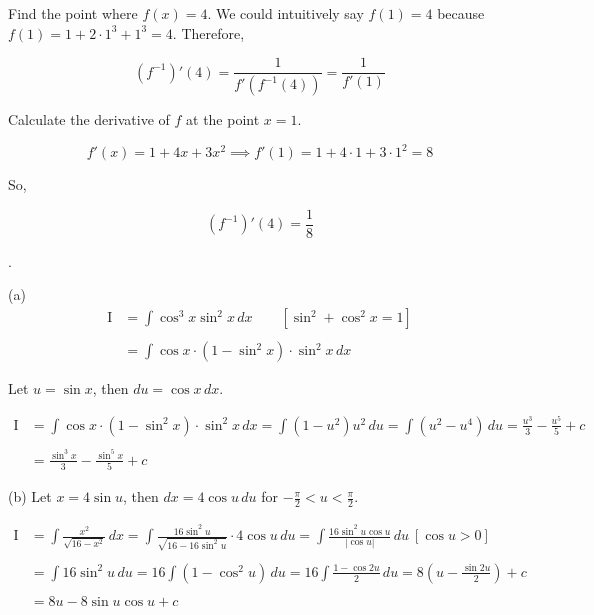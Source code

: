 \documentclass{article}
\begin{document}
\hfill

\noindent Find the point where $f(x)=4$. We could intuitively say $f(1)=4$ because $f(1)=1+2\cdot1^3+1^3=4$. Therefore,

\[(f^{-1})'\left(4\right)=\frac1{f'\left(f^{-1}(4)\right)}=\frac1{f'(1)}\]

\hfill

\noindent Calculate the derivative of $f$ at the point $x=1$.

\[f'(x)=1+4x+3x^2\implies f'(1)=1+4\cdot1+3\cdot1^2=8\]

\hfill

\noindent So,

\[(f^{-1})'\left(4\right)=\boxed{\frac18}\]

\newpage

.

\hfill

\noindent (a)
\begin{align*}
\mathrm{I}&=\int\cos^3x\sin^2x\,dx\qquad\left[\sin^2+\cos^2x=1\right]\\\\&=\int\cos x\cdot\left(1-\sin^2x\right)\cdot\sin^2x\,dx
\end{align*}

\noindent Let $u=\sin x$, then $du=\cos x\,dx$.

\hfill

\begin{align*}
\mathrm{I}&=\int\cos x\cdot\left(1-\sin^2x\right)\cdot\sin^2x\,dx=\int\left(1-u^2\right) u^2\,du=\int\left(u^2-u^4\right)\,du=\frac{u^3}3-\frac{u^5}5+c\\\\&=\boxed{\frac{\sin^3x}3-\frac{\sin^5x}5+c}
\end{align*}

\hfill

\noindent (b) Let $x=4\sin u$, then $dx=4\cos u\,du$ for $\displaystyle -\frac\pi2<u<\frac\pi2$.

\begin{align*}
\mathrm{I}&=\int\frac{x^2}{\sqrt{16-x^2}}\,dx=\int\frac{16\sin^2u}{\sqrt{16-16\sin^2u}}\cdot4\cos u\,du=\int\frac{16\sin^2u\cos u}{\left|\cos u\right|}\,du\:\left[\cos u>0\right]\\\\&=\int16\sin^2u\,du=16\int\left(1-\cos^2u\right)\,du=16\int\frac{1-\cos2u}2\,du=8\left(u-\frac{\sin2u}2\right)+c\\\\&=8u-8\sin u\cos u+c
\end{align*}
\end{document}
